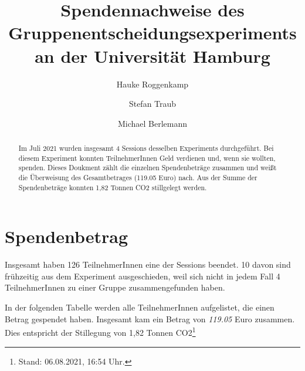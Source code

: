 \documentclass[]{elsarticle} %
\begin{document}
\begin{frontmatter}

  \title{Spendennachweise des Gruppenentscheidungsexperiments an der
Universität Hamburg}
    \author[Helmut-Schmidt-Universität]{Hauke Roggenkamp}
    \author[Helmut-Schmidt-Universität]{Stefan Traub}
  
    \author[Helmut-Schmidt-Universität]{Michael Berlemann}
  
      \address[Helmut-Schmidt-Universität]{Helmut-Schmidt-Universität,
Holstenhofweg 85, 22043 Hamburg}
  
  \begin{abstract}
  Im Juli 2021 wurden insgesamt 4 Sessions desselben Experiments
  durchgeführt. Bei diesem Experiment konnten TeilnehmerInnen Geld
  verdienen und, wenn sie wollten, spenden. Dieses Doukment zählt die
  einzelnen Spendenbeträge zusammen und weißt die Überweisung des
  Gesamtbetrages (119.05 Euro) nach. Aus der Summe der Spendenbeträge
  konnten 1,82 Tonnen CO2 stillgelegt werden.
  \end{abstract}
  
 \end{frontmatter}

\hypertarget{spendenbetrag}{%
\section{Spendenbetrag}\label{spendenbetrag}}

Insgesamt haben 126 TeilnehmerInnen eine der Sessions beendet. 10 davon
sind frühzeitig aus dem Experiment ausgeschieden, weil sich nicht in
jedem Fall 4 TeilnehmerInnen zu einer Gruppe zusammengefunden haben.

In der folgenden Tabelle werden alle TeilnehmerInnen aufgelistet, die
einen Betrag gespendet haben. Insgesamt kam ein Betrag von \emph{119.05}
Euro zusammen. Dies entspricht der Stillegung von 1,82 Tonnen
CO2\footnote{Stand: 06.08.2021, 16:54 Uhr.}

\begingroup\fontsize{7}{9}\selectfont
\end{document}
